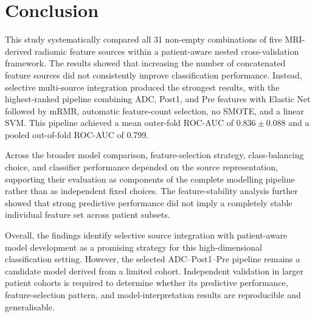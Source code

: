 \documentclass[12pt,twocolumn]{article}
\begin{document}
\section{Conclusion}
\label{sec:conclusion}

This study systematically compared all 31 non-empty combinations of
five MRI-derived radiomic feature sources within a patient-aware
nested cross-validation framework. The results showed that increasing
the number of concatenated feature sources did not consistently
improve classification performance. Instead, selective multi-source
integration produced the strongest results, with the highest-ranked
pipeline combining ADC, Post1, and Pre features with Elastic Net
followed by mRMR, automatic feature-count selection, no SMOTE, and a
linear SVM. This pipeline achieved a mean outer-fold ROC-AUC of
\(0.836 \pm 0.088\) and a pooled out-of-fold ROC-AUC of 0.799.

Across the broader model comparison, feature-selection strategy,
class-balancing choice, and classifier performance depended on the
source representation, supporting their evaluation as components of
the complete modelling pipeline rather than as independent fixed
choices. The feature-stability analysis further showed that strong
predictive performance did not imply a completely stable individual
feature set across patient subsets.

Overall, the findings identify selective source integration with
patient-aware model development as a promising strategy for this
high-dimensional classification setting. However, the selected
ADC--Post1--Pre pipeline remains a candidate model derived from a
limited cohort. Independent validation in larger patient cohorts is
required to determine whether its predictive performance,
feature-selection pattern, and model-interpretation results are
reproducible and generalisable.
\end{document}
